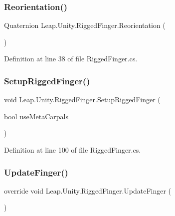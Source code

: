 \subsubsection{\texorpdfstring{Reorientation()}{Reorientation()}}
{\footnotesize\ttfamily Quaternion Leap.\+Unity.\+Rigged\+Finger.\+Reorientation (\begin{DoxyParamCaption}{ }\end{DoxyParamCaption})}



Definition at line 38 of file Rigged\+Finger.\+cs.

\mbox{\label{class_leap_1_1_unity_1_1_rigged_finger_aaea2955085d8c4ec4d97a709ee8732e7}} 
\subsubsection{\texorpdfstring{SetupRiggedFinger()}{SetupRiggedFinger()}}
{\footnotesize\ttfamily void Leap.\+Unity.\+Rigged\+Finger.\+Setup\+Rigged\+Finger (\begin{DoxyParamCaption}\item[{bool}]{use\+Meta\+Carpals }\end{DoxyParamCaption})}



Definition at line 100 of file Rigged\+Finger.\+cs.

\mbox{\label{class_leap_1_1_unity_1_1_rigged_finger_affc59ee8e673ae2c2cf8c4222749f602}} 
\subsubsection{\texorpdfstring{UpdateFinger()}{UpdateFinger()}}
{\footnotesize\ttfamily override void Leap.\+Unity.\+Rigged\+Finger.\+Update\+Finger (\begin{DoxyParamCaption}{ }\end{DoxyParamCaption})\hspace{0.3cm}{\ttfamily [virtual]}}




